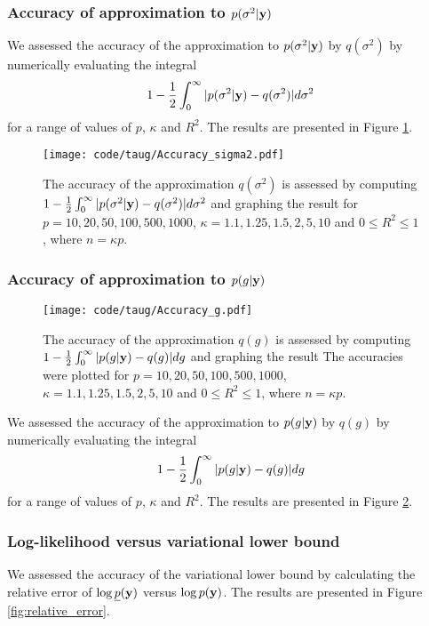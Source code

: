 \documentclass{amsart}[12pt]
\begin{document}
\subsubsection{Accuracy of approximation to $p(\sigma^2 | {\bf y})$}

We assessed the accuracy of the approximation to $p(\sigma^2 | {\bf y})$ by $q(\sigma^2)$ by numerically evaluating
the integral
\[
	1 - \frac{1}{2} \int_0^\infty |p(\sigma^2 | {\bf y}) - q(\sigma^2)| d \sigma^2
\]
for a range of values of $p$, $\kappa$ and $R^2$. The results are presented in Figure \ref{fig:accuracy_sigma2}.

\begin{figure}[p]
	\texttt{[image: code/taug/Accuracy\_sigma2.pdf]}
	\caption{The accuracy of the approximation $q(\sigma^2)$ is assessed by computing $1 -
		\frac{1}{2} \int_0^\infty |p(\sigma^2 | {\bf y}) - q(\sigma^2)| d \sigma^2$ and graphing the result for
		$p =10, 20, 50, 100, 500, 1000$, $\kappa = 1.1, 1.25, 1.5, 2, 5, 10$ and $0 \leq R^2 \leq 1$, where
		$n = \kappa p$.}
	\label{fig:accuracy_sigma2}
\end{figure}

\subsubsection{Accuracy of approximation to $p(g | {\bf y})$}

\begin{figure}[p]
	\texttt{[image: code/taug/Accuracy\_g.pdf]}
	\caption{The accuracy of the approximation $q(g)$ is assessed by computing $1 -
		\frac{1}{2} \int_0^\infty |p(g | {\bf y}) - q(g)| d g$ and graphing the result The accuracies were plotted for
		$p =10, 20, 50, 100, 500, 1000$, $\kappa = 1.1, 1.25, 1.5, 2, 5, 10$ and $0 \leq R^2 \leq 1$, where
		$n = \kappa p$.}
	\label{fig:accuracy_g}
\end{figure}

We assessed the accuracy of the approximation to $p(g | {\bf y})$ by $q(g)$ by numerically evaluating the integral
\[
	1 - \frac{1}{2} \int_0^\infty |p(g | {\bf y}) - q(g)| d g
\]
for a range of values of $p$, $\kappa$ and $R^2$. The results are presented in Figure \ref{fig:accuracy_g}.


\subsubsection{Log-likelihood versus variational lower bound}

We assessed the accuracy of the variational lower bound by calculating the relative error of
$\log{\underline{p}({\bf y})}$ versus $\log{p({\bf y})}$. The results are presented in Figure
\ref{fig:relative_error}.
\end{document}
